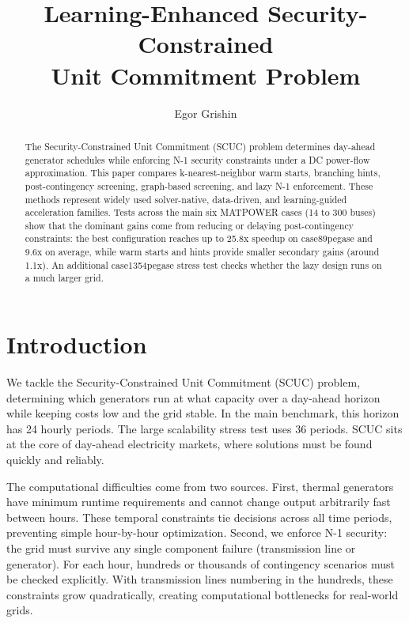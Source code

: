 \documentclass[runningheads]{llncs}
\title{Learning-Enhanced Security-Constrained\\ Unit Commitment Problem}
\author{Egor Grishin\inst{1}}
\institute{Skoltech, Moscow, Russia}
\begin{document}
\maketitle

\begin{abstract}
The Security-Constrained Unit Commitment (SCUC) problem determines day-ahead generator schedules while enforcing N-1 security constraints under a DC power-flow approximation. This paper compares k-nearest-neighbor warm starts, branching hints, post-contingency screening, graph-based screening, and lazy N-1 enforcement. These methods represent widely used solver-native, data-driven, and learning-guided acceleration families. Tests across the main six MATPOWER cases (14 to 300 buses) show that the dominant gains come from reducing or delaying post-contingency constraints: the best configuration reaches up to 25.8x speedup on case89pegase and 9.6x on average, while warm starts and hints provide smaller secondary gains (around 1.1x). An additional case1354pegase stress test checks whether the lazy design runs on a much larger grid.
\end{abstract}


\section{Introduction}
We tackle the Security-Constrained Unit Commitment (SCUC) problem, determining which generators run at what capacity over a day-ahead horizon while keeping costs low and the grid stable. In the main benchmark, this horizon has 24 hourly periods. The large scalability stress test uses 36 periods. SCUC sits at the core of day-ahead electricity markets, where solutions must be found quickly and reliably.

The computational difficulties come from two sources. First, thermal generators have minimum runtime requirements and cannot change output arbitrarily fast between hours. These temporal constraints tie decisions across all time periods, preventing simple hour-by-hour optimization. Second, we enforce N-1 security: the grid must survive any single component failure (transmission line or generator). For each hour, hundreds or thousands of contingency scenarios must be checked explicitly. With transmission lines numbering in the hundreds, these constraints grow quadratically, creating computational bottlenecks for real-world grids.
\end{document}
